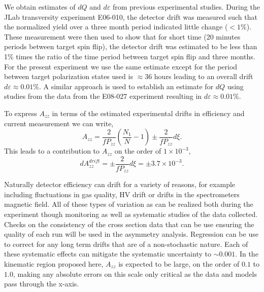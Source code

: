 We obtain estimates of $dQ$ and $d\varepsilon$ from previous experimental
studies.  During the JLab transversity experiment E06-010, the detector drift was measured such that the normalized yield over a three month period indicated little change ($<1$\%).
These measurement were then used to show that for short time (20 minutes periods between target spin flip),
the detector drift was estimated to be less than 1\% times the ratio of the time period between target spin flip and three months.
For the present experiment we use the same estimate except for the period between target polarization states used is
$\approx 36$ hours leading to an overall drift $d\varepsilon\approx 0.01\%$.  A similar approach is used to establish an estimate
for $dQ$ using studies from the data from the E08-027 experiment resulting in $d\varepsilon \approx 0.01\%$.

To express $A_{zz}$ in terms of the estimated experimental drifts in efficiency and current measurement we can write,
\begin{equation}
A_{zz}=\frac{2}{fP_{zz}}\left(\frac{N_1}{N}-1\right)\pm\frac{2}{fP_{zz}}d\xi.
\end{equation}
This leads to a contribution to $A_{zz}$ on the order of $1\times10^{-3}$,
\begin{equation}
dA_{zz}^{drift}=\pm\frac{2}{fP_{zz}}d\xi=\pm3.7\times10^{-3}.
\end{equation}

Naturally detector efficiency can drift for a variety of reasons, for
example including fluctuations in gas quality, HV drift or
drifts in the spectrometers magnetic field.  All of these types of variation as can be realized both
during the experiment though monitoring as well as systematic studies of the data collected.
Checks on the consistency of the cross section data that can be use ensuring the quality of each run will be used in the asymmetry analysis.  Regression can be use to correct for any long term drifts that are of a non-stochastic nature.
Each of these systematic effects can mitigate the systematic uncertainty to $\sim0.001$. 
In the kinematic region proposed here, $A_{zz}$ is expected to be large, on the order of $0.1$ to $1.0$, making any absolute errors on this scale only critical as the data and models pass through the x-axis.  

\fi








